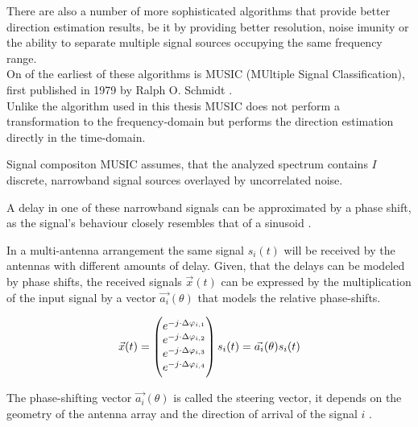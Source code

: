 There are also a number of more sophisticated algorithms
that provide better direction estimation results, be it
by providing better resolution, noise imunity or the
ability to separate multiple signal sources occupying
the same frequency range. \\

On of the earliest of these algorithms is MUSIC
(MUltiple Signal Classification), first published in
1979 by Ralph O. Schmidt \cite{schmidt1979}. \\

Unlike the algorithm used in this thesis MUSIC
does not perform a transformation to the frequency-domain
but performs the direction estimation directly
in the time-domain. \\


\begin{subchapter}{Signal compositon}
  MUSIC assumes, that the analyzed spectrum contains
  $I$ discrete, narrowband signal sources overlayed by
  uncorrelated noise.

  A delay in one of these narrowband signals can be approximated
  by a phase shift, as the signal's behaviour closely resembles
  that of a sinusoid \cite[p. 4]{girdmusic}.

  In a multi-antenna arrangement the same signal $s_{i}(t)$ will be
  received by the antennas with different amounts of delay.
  Given, that the delays can be modeled by phase shifts,
  the received signals $\vec{x}(t)$ can be expressed by the multiplication
  of the input signal by a vector $\vec{a_{i}}(\theta)$ that models the
  relative phase-shifts.

  \begin{equation}
    \vec{x}(t) =
    \begin{pmatrix}
      e^{-j \cdot \Delta\varphi_{i,1}} \\
      e^{-j \cdot \Delta\varphi_{i,2}} \\
      e^{-j \cdot \Delta\varphi_{i,3}} \\
      e^{-j \cdot \Delta\varphi_{i,4}}
    \end{pmatrix} s_{i}(t) = \\
    \vec{a_{i}}(\theta) s_{i}(t)
  \end{equation}

  The phase-shifting vector $\vec{a_{i}}(\theta)$ is called the
  steering vector, it depends on the geometry of the antenna array
  and the direction of arrival of the signal $i$ \cite{chengokeda2010}. \\


\end{subchapter}
